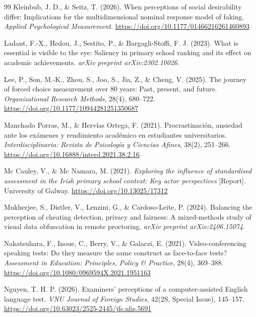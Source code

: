 \documentclass[11pt]{article}
\begin{document}
\begin{thebibliography}{99}
Kleinbub, J. D., \& Seitz, T. (2026). When perceptions of social desirability differ: Implications for the multidimensional nominal response model of faking. \textit{Applied Psychological Measurement}. \url{https://doi.org/10.1177/01466216261460893}

Ladant, F.-X., Hedou, J., Sestito, P., \& Bargagli-Stoffi, F. J. (2023). What is essential is visible to the eye: Saliency in primary school ranking and its effect on academic achievements. \textit{arXiv preprint arXiv:2302.10026}.

Lee, P., Son, M.-K., Zhou, S., Joo, S., Jia, Z., \& Cheng, V. (2025). The journey of forced choice measurement over 80 years: Past, present, and future. \textit{Organizational Research Methods}, 28(4), 680--722. \url{https://doi.org/10.1177/10944281251350687}

Manchado Porras, M., \& Herv\'ias Ortega, F. (2021). Procrastinaci\'on, ansiedad ante los ex\'amenes y rendimiento acad\'emico en estudiantes universitarios. \textit{Interdisciplinaria: Revista de Psicolog\'ia y Ciencias Afines}, 38(2), 251--266. \url{https://doi.org/10.16888/interd.2021.38.2.16}

Mc Cauley, V., \& Mc Namara, M. (2021). \textit{Exploring the influence of standardised assessment in the Irish primary school context: Key actor perspectives} [Report]. University of Galway. \url{https://doi.org/10.13025/17312}

Mukherjee, S., Distler, V., Lenzini, G., \& Cardoso-Leite, P. (2024). Balancing the perception of cheating detection, privacy and fairness: A mixed-methods study of visual data obfuscation in remote proctoring. \textit{arXiv preprint arXiv:2406.15074}.

Nakatsuhara, F., Inoue, C., Berry, V., \& Galaczi, E. (2021). Video-conferencing speaking tests: Do they measure the same construct as face-to-face tests? \textit{Assessment in Education: Principles, Policy \& Practice}, 28(4), 369--388. \url{https://doi.org/10.1080/0969594X.2021.1951163}

Nguyen, T. H. P. (2026). Examiners' perceptions of a computer-assisted English language test. \textit{VNU Journal of Foreign Studies}, 42(2S, Special Issue), 145--157. \url{https://doi.org/10.63023/2525-2445/jfs.ulis.5691}


\end{thebibliography}
\end{document}
